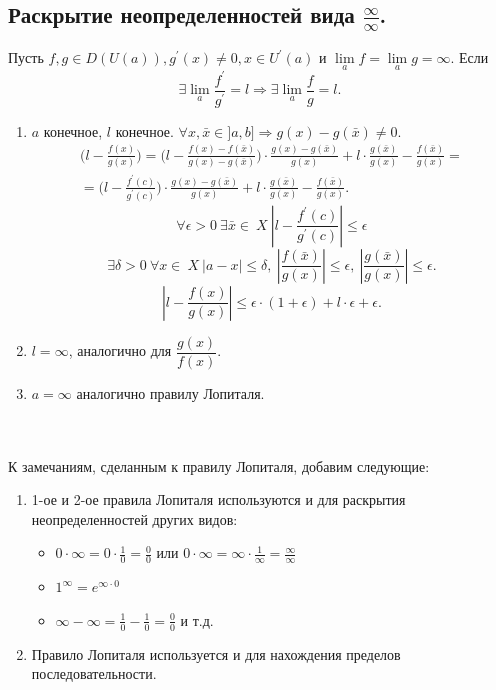	\subsection{Раскрытие неопределенностей вида $\frac{\infty}{\infty}$.}
	\begin{theorem}
		Пусть $f, g \in D(U(a)), g^\prime(x) \neq 0, x \in U^\prime(a)$ и $\lim\limits_{a}f=\lim\limits_{a}g=\infty$. 
		Если $$\exists\lim_{a}\frac{f^\prime}{g^\prime}=l \Rightarrow \exists\lim_{a}\frac{f}{g}=l.$$
	\end{theorem}
	\begin{Proof}
		\begin{enumerate}
			\item $a$ конечное, $l$ конечное.
			$\forall x, \bar{x} \in ]a,b] \Rightarrow g(x)-g(\bar{x}) \neq 0$.
			\begin{multline*}
				\Big(l-\frac{f(x)}{g(x)}\Big) = \Big(l-\frac{f(x)-f(\bar{x})}{g(x)-g(\bar{x})}\Big)\cdot\frac{g(x)-g(\bar{x})}{g(x)}+l\cdot\frac{g(\bar{x})}{g(x)}-\frac{f(\bar{x})}{g(x)}=\\=\Big(l-\frac{f^\prime(c)}{g^\prime(c)}\Big)\cdot\frac{g(x)-g(\bar{x})}{g(x)}+l\cdot\frac{g(\bar{x})}{g(x)}-\frac{f(\bar{x})}{g(x)}.
			\end{multline*}
			$$\forall \epsilon>0\ \exists \bar{x} \in \ X\ \left|l-\frac{f^\prime(c)}{g^\prime(c)}\right|\leq \epsilon$$
			$$\exists \delta > 0\ \forall x \in \ X\ \left|a-x\right| \leq \delta,\ \left|\frac{f(\bar{x})}{g(x)}\right| \leq \epsilon,\ \left|\frac{g(\bar{x})}{g(x)}\right| \leq \epsilon.$$
			$$\left|l-\frac{f(x)}{g(x)}\right| \leq \epsilon\cdot(1+\epsilon)+l\cdot\epsilon+\epsilon.$$
			\item $l=\infty$, аналогично для $\dfrac{g(x)}{f(x)}$.
			\item $a=\infty$ аналогично правилу Лопиталя.
		\end{enumerate}
	\end{Proof}\\\\
	К замечаниям, сделанным к правилу Лопиталя, добавим следующие:
	\begin{enumerate}
		\item 1-ое и 2-ое правила Лопиталя используются и для раскрытия неопределенностей других видов:
		\begin{itemize}
			\item $0 \cdot \infty = 0 \cdot \frac{1}{0} = \frac{0}{0}$ или $0 \cdot \infty = \infty \cdot \frac{1}{\infty} = \frac{\infty}{\infty}$
			\item $1^\infty = e^{\infty\cdot0}$
			\item $\infty - \infty = \frac{1}{0} - \frac{1}{0} = \frac{0}{0}$ и т.д.
		\end{itemize}
		\item Правило Лопиталя используется и для нахождения пределов последовательности.
	\end{enumerate}
